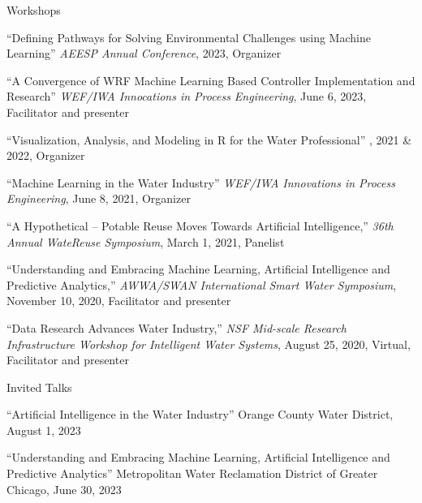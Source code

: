 \documentclass{resume} %
\begin{document}

\begin{rSection}{Workshops}

``Defining Pathways for Solving Environmental Challenges using Machine Learning'' \emph{AEESP Annual Conference}, 2023, Organizer

``A Convergence of WRF Machine Learning Based Controller Implementation and Research'' \emph{WEF/IWA Innocations in Process Engineering}, June 6, 2023, Facilitator and presenter

``Visualization, Analysis, and Modeling in R for the Water Professional'' , 2021 \& 2022, Organizer

``Machine Learning in the Water Industry'' \emph{WEF/IWA Innovations in Process Engineering}, June 8, 2021, Organizer

``A Hypothetical – Potable Reuse Moves Towards Artificial Intelligence,'' \emph{36th Annual WateReuse Symposium}, March 1, 2021, Panelist

``Understanding and Embracing Machine Learning, Artificial Intelligence and Predictive Analytics,'' \emph{AWWA/SWAN International Smart Water Symposium}, November 10, 2020, Facilitator and presenter

``Data Research Advances Water Industry,'' \emph{NSF Mid-scale Research Infrastructure Workshop for Intelligent Water Systems}, August 25, 2020, Virtual, Facilitator and presenter

\end{rSection}

\begin{rSection}{Invited Talks}

``Artificial Intelligence in the Water Industry'' Orange County Water District, August 1, 2023

``Understanding and Embracing Machine Learning, Artificial Intelligence and Predictive Analytics'' Metropolitan Water Reclamation District of Greater Chicago, June 30, 2023

\end{rSection}


\end{document}
